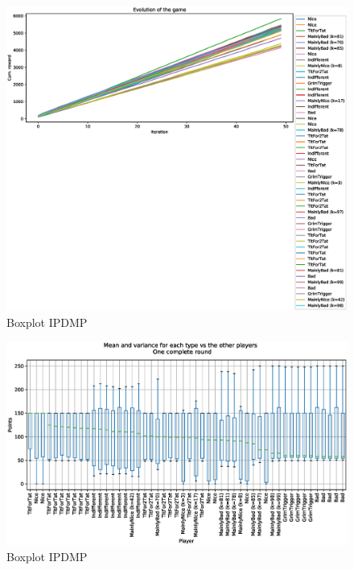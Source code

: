 \documentclass[journal,a4paper,10pt,twoside]{IEEEtran} %
\begin{document}
\begin{figure}[!ht]
    \centering
    \includegraphics[width=1\columnwidth]{../img/ipdmp/ipdmp-evolution-of-game-50}
    \caption{Boxplot IPDMP}
    \label{fig:boxIPDMP}
\end{figure}

\begin{figure}[!ht]
    \centering
    \includegraphics[width=1\columnwidth]{../img/ipdmp/ipdmp-boxplot-single-match-50}
    \caption{Boxplot IPDMP}
    \label{fig:boxIPDMP}
\end{figure}
\end{document}
